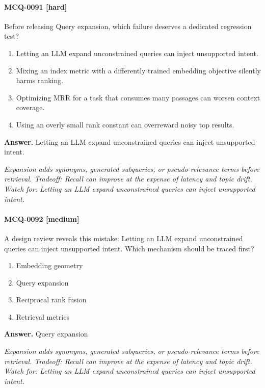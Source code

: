 \paragraph{MCQ-0091 [hard]} Before releasing Query expansion, which failure deserves a dedicated regression test?
\begin{enumerate}[label=\Alph*.]
\item Letting an LLM expand unconstrained queries can inject unsupported intent.
\item Mixing an index metric with a differently trained embedding objective silently harms ranking.
\item Optimizing MRR for a task that consumes many passages can worsen context coverage.
\item Using an overly small rank constant can overreward noisy top results.
\end{enumerate}
\noindent\textbf{Answer.} Letting an LLM expand unconstrained queries can inject unsupported intent.
\par\textit{Expansion adds synonyms, generated subqueries, or pseudo-relevance terms before retrieval. Tradeoff: Recall can improve at the expense of latency and topic drift. Watch for: Letting an LLM expand unconstrained queries can inject unsupported intent.}
\paragraph{MCQ-0092 [medium]} A design review reveals this mistake: Letting an LLM expand unconstrained queries can inject unsupported intent. Which mechanism should be traced first?
\begin{enumerate}[label=\Alph*.]
\item Embedding geometry
\item Query expansion
\item Reciprocal rank fusion
\item Retrieval metrics
\end{enumerate}
\noindent\textbf{Answer.} Query expansion
\par\textit{Expansion adds synonyms, generated subqueries, or pseudo-relevance terms before retrieval. Tradeoff: Recall can improve at the expense of latency and topic drift. Watch for: Letting an LLM expand unconstrained queries can inject unsupported intent.}

